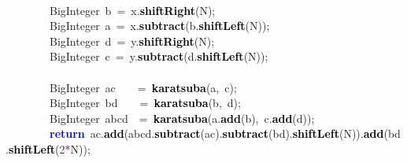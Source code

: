 {{\mbox{}\ \ \ \ \ \ \ \ \\
\mbox{}\ \ \ \ \ \ \ \ \textcolor{TealBlue}{BigInteger}\ b\ \textcolor{BrickRed}{=}\ x\textcolor{BrickRed}{.}\textbf{\textcolor{Black}{shiftRight}}\textcolor{BrickRed}{(}N\textcolor{BrickRed}{);} \\
\mbox{}\ \ \ \ \ \ \ \ \textcolor{TealBlue}{BigInteger}\ a\ \textcolor{BrickRed}{=}\ x\textcolor{BrickRed}{.}\textbf{\textcolor{Black}{subtract}}\textcolor{BrickRed}{(}b\textcolor{BrickRed}{.}\textbf{\textcolor{Black}{shiftLeft}}\textcolor{BrickRed}{(}N\textcolor{BrickRed}{));} \\
\mbox{}\ \ \ \ \ \ \ \ \textcolor{TealBlue}{BigInteger}\ d\ \textcolor{BrickRed}{=}\ y\textcolor{BrickRed}{.}\textbf{\textcolor{Black}{shiftRight}}\textcolor{BrickRed}{(}N\textcolor{BrickRed}{);} \\
\mbox{}\ \ \ \ \ \ \ \ \textcolor{TealBlue}{BigInteger}\ c\ \textcolor{BrickRed}{=}\ y\textcolor{BrickRed}{.}\textbf{\textcolor{Black}{subtract}}\textcolor{BrickRed}{(}d\textcolor{BrickRed}{.}\textbf{\textcolor{Black}{shiftLeft}}\textcolor{BrickRed}{(}N\textcolor{BrickRed}{));} \\
\mbox{}\ \ \ \ \ \ \ \ \\
\mbox{}\ \ \ \ \ \ \ \ \textcolor{TealBlue}{BigInteger}\ ac\ \ \ \ \textcolor{BrickRed}{=}\ \textbf{\textcolor{Black}{karatsuba}}\textcolor{BrickRed}{(}a\textcolor{BrickRed}{,}\ c\textcolor{BrickRed}{);} \\
\mbox{}\ \ \ \ \ \ \ \ \textcolor{TealBlue}{BigInteger}\ bd\ \ \ \ \textcolor{BrickRed}{=}\ \textbf{\textcolor{Black}{karatsuba}}\textcolor{BrickRed}{(}b\textcolor{BrickRed}{,}\ d\textcolor{BrickRed}{);} \\
\mbox{}\ \ \ \ \ \ \ \ \textcolor{TealBlue}{BigInteger}\ abcd\ \ \textcolor{BrickRed}{=}\ \textbf{\textcolor{Black}{karatsuba}}\textcolor{BrickRed}{(}a\textcolor{BrickRed}{.}\textbf{\textcolor{Black}{add}}\textcolor{BrickRed}{(}b\textcolor{BrickRed}{),}\ c\textcolor{BrickRed}{.}\textbf{\textcolor{Black}{add}}\textcolor{BrickRed}{(}d\textcolor{BrickRed}{));} \\
\mbox{}\ \ \ \ \ \ \ \ \textbf{\textcolor{Blue}{return}}\ ac\textcolor{BrickRed}{.}\textbf{\textcolor{Black}{add}}\textcolor{BrickRed}{(}abcd\textcolor{BrickRed}{.}\textbf{\textcolor{Black}{subtract}}\textcolor{BrickRed}{(}ac\textcolor{BrickRed}{).}\textbf{\textcolor{Black}{subtract}}\textcolor{BrickRed}{(}bd\textcolor{BrickRed}{).}\textbf{\textcolor{Black}{shiftLeft}}\textcolor{BrickRed}{(}N\textcolor{BrickRed}{)).}\textbf{\textcolor{Black}{add}}\textcolor{BrickRed}{(}bd\textcolor{BrickRed}{.}\textbf{\textcolor{Black}{shiftLeft}}\textcolor{BrickRed}{(}\textcolor{Purple}{2}\textcolor{BrickRed}{*}N\textcolor{BrickRed}{));} \\
}}
